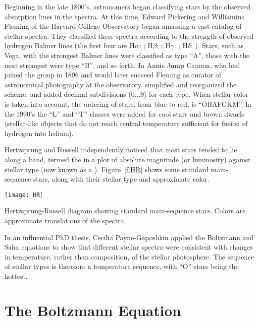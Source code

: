 Beginning in the late 1800's, astronomers began classifying stars by the observed absorption lines in the spectra. At this time, Edward Pickering and Williamina Fleming of the Harvard College Observatory began amassing a vast catalog of stellar spectra. They classified these spectra according to the strength of observed hydrogen Balmer lines (the first four are H$\alpha$: ; H$\beta$: ; H$\gamma$: ; H$\delta$: ). Stars, such as Vega, with the strongest Balmer lines were classified as type ``A'', those with the next strongest were type ``B'', and so forth. In Annie Jump Cannon, who had joined the group in 1896 and would later succeed Fleming as curator of astronomical photography at the observatory, simplified and reorganized the scheme, and added decimal subdivisions ($0\ldots9$) for each type. When stellar color is taken into account, the ordering of stars, from blue to red, is ``OBAFGKM''. In the 1990's the ``L'' and ``T'' classes were added\cite{Kirkpatrick1999Dwarfs-Cooler-t} for cool stars and brown dwarfs (stellar-like objects that do not reach central temperature sufficient for fusion of hydrogen into helium).

Hertzsprung and Russell independently noticed that most stars tended to lie along a band, termed the  in a plot of absolute magnitude (or luminosity) against stellar type (now known as a ). Figure~\ref{f.HR} shows some standard main-sequence stars, along with their stellar type and approximate color.
\begin{marginfigure}
\texttt{[image: HR]}
\caption{\label{f.HR} Hertzsprung-Russell diagram showing standard main-sequence stars. Colors are approximate translations of the spectra.}
\end{marginfigure}

In an influential PhD thesis, Cecilia Payne-Gaposhkin\cite{Payne1925Stellar-Atmosph} applied the Boltzmann and Saha equations to show that different stellar spectra were consistent with changes in temperature, rather than composition, of the stellar photosphere. The sequence of stellar types is therefore a temperature sequence, with ``O'' stars being the hottest. 

\section{The Boltzmann Equation}
\label{s.boltzmann-eqn}

